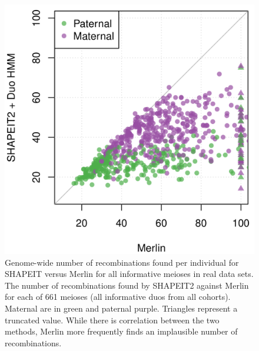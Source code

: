 \begin{figure}
   \includegraphics[width=.5\textwidth]{chap4figs/combined-merlin-vs-shapeit}    
   \centering
  \caption[Recombination rates per individual found by DuoHMM against Merlin]{Genome-wide number of recombinations found per individual for SHAPEIT versus Merlin for all informative meioses in real data sets. The number of recombinations found by SHAPEIT2 against Merlin for each of 661 meioses (all informative duos from all cohorts).  Maternal are in green and paternal purple. Triangles represent a truncated value.  While there is correlation between the two methods, Merlin more frequently finds an implausible number of recombinations.\label{fig:merlin-shapeit-rec}}
\end{figure}

